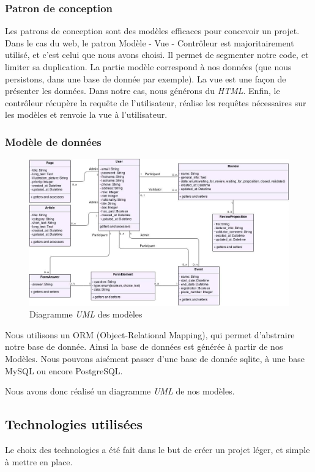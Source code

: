 \documentclass[a4paper,11pt]{article}
\begin{document}
\subsubsection{Patron de conception}

Les patrons de conception sont des modèles efficaces pour concevoir un projet. Dans le cas du web, le patron Modèle - Vue - Contrôleur est majoritairement utilisé, et c'est celui que nous avons choisi. Il permet de segmenter notre code, et limiter sa duplication. La partie modèle correspond à nos données (que nous persistons, dans une base de donnée par exemple). La vue est une façon de présenter les données. Dans notre cas, nous générons du \textit{HTML}. Enfin, le contrôleur récupère la requête de l'utilisateur, réalise les requêtes nécessaires sur les modèles et renvoie la vue à l'utilisateur.

\subsubsection{Modèle de données}
\label{mdd}

\begin{figure}[!h]
   \includegraphics[width=15cm]{fig/uml-models}
   \caption{\label{uml} Diagramme \textit{UML} des modèles}
\end{figure}
Nous utilisons un ORM (Object-Relational Mapping), qui permet d'abstraire notre base de donnée. Ainsi la base de données est générée à partir de nos Modèles. Nous pouvons aisément passer d'une base de donnée sqlite, à une base MySQL ou encore PostgreSQL.

Nous avons donc réalisé un diagramme \textit{UML} de nos modèles.

\subsection{Technologies utilisées}
Le choix des technologies a été fait dans le but de créer un projet léger, et simple à mettre en place. 
\end{document}
